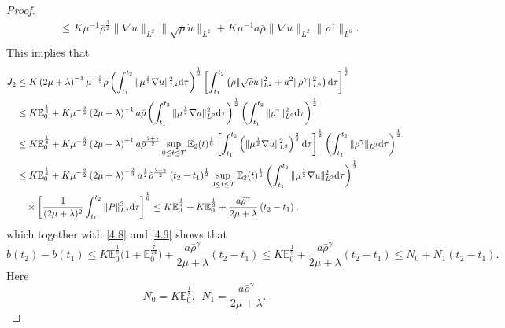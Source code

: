 \documentclass[10pt,a4paper]{amsart}
\begin{document}
\begin{proof}
$$\begin{aligned}
& \leq K \mu^{-1} \bar{\rho}^{\frac{3}{2}} \|\nabla u\|_{L^2} \|\sqrt{\rho} \dot{u}\|_{L^2} + K \mu^{-1} a \bar{\rho} \|\nabla u\|_{L^2} \|\rho^{\gamma}\|_{L^6}. \\
\end{aligned}
$$
This implies that
\begin{align*}
J_2
& \leq K \left(2 \mu + \lambda \right)^{-1} \mu^{-\frac{3}{2}} \bar{\rho} \left(\int^{t_2}_{t_1} \|\mu^{\frac{1}{2}}\nabla u\|_{L^2}^2 \mathrm{d} \tau \right)^{\frac{1}{2}} \left[\int^{t_2}_{t_1} \left(\bar{\rho} \|\sqrt{\rho} \dot{u}\|_{L^2}^2 + a^2 \|\rho^{\gamma}\|_{L^6}^2 \right)\mathrm{d} \tau \right]^{\frac{1}{2}}\notag\\
& \leq K \mathbb{E}_0^{\frac{1}{4}} + K \mu^{-\frac{3}{2}} \left(2 \mu + \lambda \right)^{-1} a \bar{\rho} \left( \int^{t_2}_{t_1} \|\mu^{\frac{1}{2}}\nabla u\|_{L^2}^2 \mathrm{d} \tau \right)^{\frac{1}{2}} \left(\int^{t_2}_{t_1} \|\rho^{\gamma}\|_{L^6}^2\mathrm{d} \tau \right)^{\frac{1}{2}}\notag\\
& \leq K \mathbb{E}_0^{\frac{1}{4}}  + K \mu^{-\frac{3}{2}} \left(2 \mu + \lambda \right)^{-1} a \bar{\rho}^{\frac{2 + \gamma}{2}} \sup_{0 \leq t \leq T} \mathbb{E}_2(t)^{\frac{1}{6}} \left[\int^{t_2}_{t_1} \left(\|\mu^{\frac{1}{2}}\nabla u\|_{L^2}^2 \right)^{\frac{2}{3}} \mathrm{d} \tau \right]^{\frac{1}{2}} \left(\int^{t_2}_{t_1} \|\rho^{\gamma}\|_{L^3}\mathrm{d} \tau \right)^{\frac{1}{2}}\notag\\
& \leq K \mathbb{E}_0^{\frac{1}{4}}  + K \mu^{-\frac{3}{2}} \left(2 \mu + \lambda \right)^{-\frac{2}{3}} a^{\frac{1}{2}} \bar{\rho}^{\frac{2 + \gamma}{2}}  \left( t_2 - t_1 \right)^{\frac{1}{2}} \sup_{0 \leq t \leq T} \mathbb{E}_2(t)^{\frac{1}{6}} \left(\int^{t_2}_{t_1} \|\mu^{\frac{1}{2}}\nabla u\|_{L^2}^2 \mathrm{d} \tau \right)^{\frac{1}{3}}\notag \\
& \quad \times\left[\frac{1}{(2 \mu + \lambda )^2} \int^{t_2}_{t_1} \|P\|_{L^3}^3 \mathrm{d} \tau \right]^{\frac{1}{6}} \leq K \mathbb{E}_0^{\frac{1}{4}} + K \mathbb{E}_0^{\frac{1}{3}} + \frac{a \bar{\rho}^{\gamma}}{2 \mu + \lambda } \left( t_2 - t_1 \right),
\end{align*}
which together with \eqref{4.8} and \eqref{4.9} shows that
$$
b(t_2) - b(t_1)
\leq K\mathbb{E}_0^{\frac{1}{8}} \Big(1 + \mathbb{E}_0^{\frac{7}{24}} \Big) + \frac{a \bar{\rho}^{\gamma}}{2 \mu + \lambda } \left( t_2 - t_1 \right) \leq K \mathbb{E}_0^{\frac{1}{8}} + \frac{a \bar{\rho}^{\gamma}}{2 \mu + \lambda } \left( t_2 - t_1 \right) \leq N_0 + N_1 \left( t_2 - t_1 \right).
$$
Here
$$
N_0 = K \mathbb{E}_0^{\frac{1}{8}}, \ \ N_1 = \frac{a \bar{\rho}^{\gamma}}{2 \mu + \lambda }.
$$


\end{proof}
\end{document}
